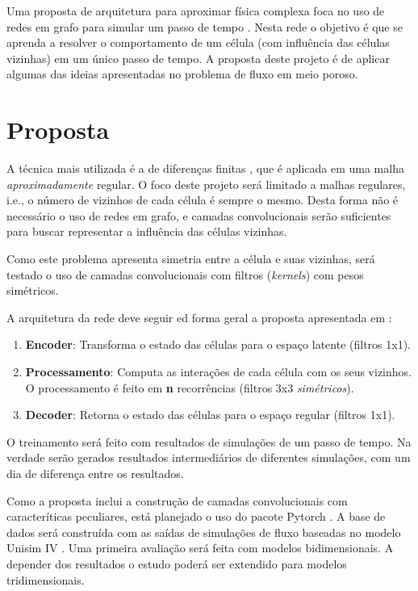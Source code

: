 \documentclass[final,5p]{elsarticle}
\numberwithin{equation}{section}
\begin{document}
    Uma proposta de arquitetura para aproximar física complexa foca no uso de redes em grafo para simular um passo de tempo \cite{sanchez2020learning}. Nesta rede o objetivo é que se aprenda a resolver o comportamento de um célula (com influência das células vizinhas) em um único passo de tempo. A proposta deste projeto é de aplicar algumas das ideias apresentadas no problema de fluxo em meio poroso.

\section{Proposta}

    A técnica mais utilizada é a de diferenças finitas \cite{computer2022cmg,schlumberger2009technical}, que é aplicada em uma malha \emph{aproximadamente} regular. O foco deste projeto será limitado a malhas regulares, i.e., o número de vizinhos de cada célula é sempre o mesmo. Desta forma não é necessário o uso de redes em grafo, e camadas convolucionais serão suficientes para buscar representar a influência das células vizinhas.

    Como este problema apresenta simetria entre a célula e suas vizinhas, será testado o uso de camadas convolucionais com filtros (\emph{kernels}) com pesos simétricos.

    A arquitetura da rede deve seguir ed forma geral a proposta apresentada em \cite{sanchez2020learning}:

    \begin{enumerate}
        \item \textbf{Encoder}: Transforma o estado das células para o espaço latente (filtros 1x1).
        \item \textbf{Processamento}: Computa as interações de cada célula com os seus vizinhos. O processamento é feito em \textbf{n} recorrências (filtros 3x3 \emph{simétricos}).
        \item \textbf{Decoder}: Retorna o estado das células para o espaço regular (filtros 1x1).
    \end{enumerate}

    O treinamento será feito com resultados de simulações de um passo de tempo. Na verdade serão gerados resultados intermediários de diferentes simulações, com um dia de diferença entre os resultados.

    Como a proposta inclui a construção de camadas convolucionais com caracteríticas peculiares, está planejado o uso do pacote Pytorch \cite{paszke2019pytorch}. A base de dados será construída com as saídas de simulações de fluxo baseadas no modelo Unisim IV \cite{botechia2023unisim}. Uma primeira avaliação será feita com modelos bidimensionais. A depender dos resultados o estudo poderá ser extendido para modelos tridimensionais.
\end{document}
